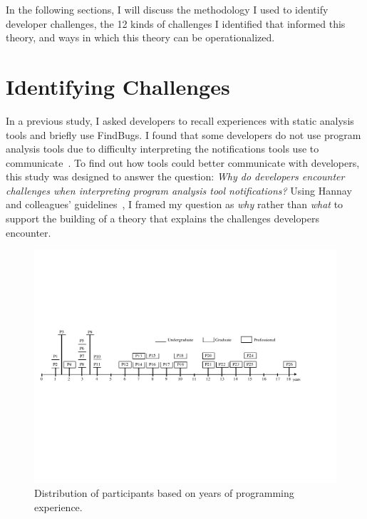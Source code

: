 In the following sections, I will discuss the methodology I used to identify developer challenges, the 12 kinds of challenges I identified that informed this theory, and ways in which this theory can be operationalized.

\section{Identifying Challenges}



In a previous study, I asked developers to recall experiences with static analysis tools and briefly use FindBugs. I found that some developers do not use program analysis tools due to difficulty interpreting the notifications tools use to communicate~\cite{johnson2013don}. 
To find out how tools could better communicate with developers, this study was designed to answer the
question: \noindent\emph{Why do developers encounter challenges when interpreting program analysis tool notifications?} Using Hannay and colleagues' guidelines~\cite{hannay2007systematic}, 
I framed my question as \emph{why} rather than \emph{what} to support the building of a theory that explains the challenges developers encounter.

\begin{figure} [ht]
\centering
\includegraphics[width=\textwidth]{Chapter-4/figs/participants.pdf}
\caption{Distribution of participants based on years of programming
experience.}
\label{fig:participants}
\end{figure}

